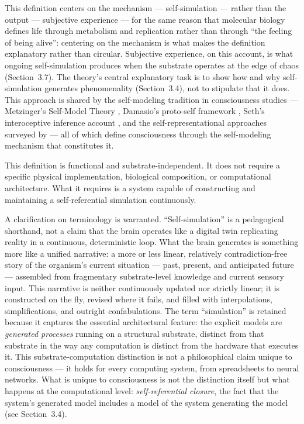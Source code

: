 \documentclass[12pt]{article}
\begin{document}
This definition centers on the mechanism --- self-simulation --- rather than the output --- subjective experience --- for the same reason that molecular biology defines life through metabolism and replication rather than through ``the feeling of being alive'': centering on the mechanism is what makes the definition explanatory rather than circular. Subjective experience, on this account, is what ongoing self-simulation produces when the substrate operates at the edge of chaos (Section~3.7). The theory's central explanatory task is to show how and why self-simulation generates phenomenality (Section~3.4), not to stipulate that it does. This approach is shared by the self-modeling tradition in consciousness studies --- Metzinger's Self-Model Theory \citep{Metzinger2003}, Damasio's proto-self framework \citep{Damasio1999,Damasio2010}, Seth's interoceptive inference account \citep{Seth2021}, and the self-representational approaches surveyed by \citet{Kriegel2006} --- all of which define consciousness through the self-modeling mechanism that constitutes it.

This definition is functional and substrate-independent. It does not require a specific physical implementation, biological composition, or computational architecture. What it requires is a system capable of constructing and maintaining a self-referential simulation continuously.

A clarification on terminology is warranted. ``Self-simulation'' is a pedagogical shorthand, not a claim that the brain operates like a digital twin replicating reality in a continuous, deterministic loop. What the brain generates is something more like a unified narrative: a more or less linear, relatively contradiction-free story of the organism's current situation --- past, present, and anticipated future --- assembled from fragmentary substrate-level knowledge and current sensory input. This narrative is neither continuously updated nor strictly linear; it is constructed on the fly, revised where it fails, and filled with interpolations, simplifications, and outright confabulations. The term ``simulation'' is retained because it captures the essential architectural feature: the explicit models are \emph{generated processes} running on a structural substrate, distinct from that substrate in the way any computation is distinct from the hardware that executes it. This substrate-computation distinction is not a philosophical claim unique to consciousness --- it holds for every computing system, from spreadsheets to neural networks. What is unique to consciousness is not the distinction itself but what happens at the computational level: \emph{self-referential closure}, the fact that the system's generated model includes a model of the system generating the model (see Section~3.4).
\end{document}
